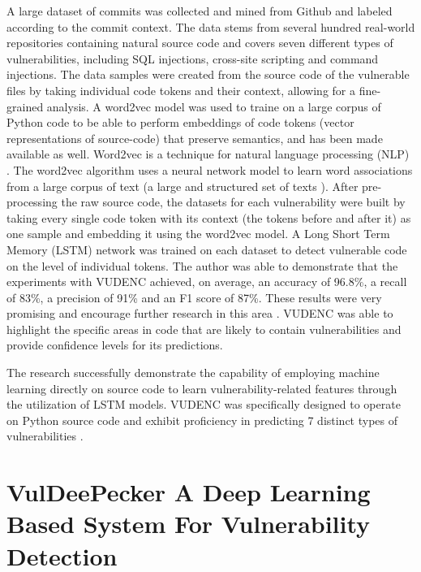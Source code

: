 A large dataset of commits was collected and mined from Github and labeled according to the commit context. The data stems from several hundred real-world repositories containing natural source code and covers seven different types of vulnerabilities, including SQL injections, cross-site scripting and command injections. The data samples were created from the source code of the vulnerable files by taking individual code tokens and their context, allowing for a fine-grained analysis. A word2vec model was used to traine on a large corpus of Python code to be able to perform embeddings of code tokens (vector representations of source-code) that preserve semantics, and has been made available as well. Word2vec \cite{Word2vec} is a technique for natural language processing (NLP) \cite{NLP_WIKIPEDIA}. The word2vec algorithm uses a neural network model to learn word associations from a large corpus of text (a large and structured set of texts ). After pre-processing the raw source code, the datasets for each vulnerability were built by taking every single code token with its context (the tokens before and after it) as one sample and embedding it using the word2vec model. A Long Short Term Memory (LSTM) network was trained on each dataset to detect vulnerable code on the level of individual tokens. The author was able to demonstrate that the experiments with VUDENC achieved, on average, an accuracy of 96.8\%, a recall of 83\%, a precision of 91\% and an F1 score of 87\%. These results were very promising and encourage further research in this area \cite{Wartschinski2019}. VUDENC was able to highlight the specific areas in code that are likely to contain vulnerabilities and provide confidence levels for its predictions.

The research successfully demonstrate the capability of employing machine learning directly on source code to learn vulnerability-related features through the utilization of LSTM models. VUDENC was specifically designed to operate on Python source code and exhibit proficiency in predicting 7 distinct types of vulnerabilities \cite{Wartschinski2019}.


\section{VulDeePecker A Deep Learning Based System For Vulnerability Detection} %
\label{sec:	VulDeePecker_A_Deep_Learning_Based_System_For_Vulnerability_Detection}


